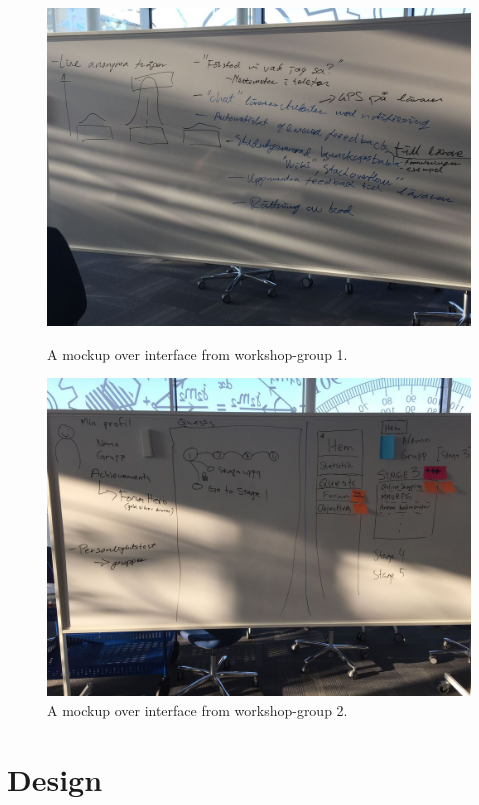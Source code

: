 \documentclass[a4paper,12pt]{article}
\begin{document}
\begin{figure}[H]
  \centering
  \begin{minipage}[b]{0.7\textwidth}
    \includegraphics[width=\textwidth]{Grupp1_Workshop_mockup}
    \caption{A mockup over interface from workshop-group 1.}
  \end{minipage}
  \hfill
  \begin{minipage}[b]{0.7\textwidth}
    \includegraphics[width=\textwidth]{Grupp2_Workshop_mockup}
    \caption{A mockup over interface from workshop-group 2.}
  \end{minipage}
\end{figure}



\section{Design}
\end{document}
